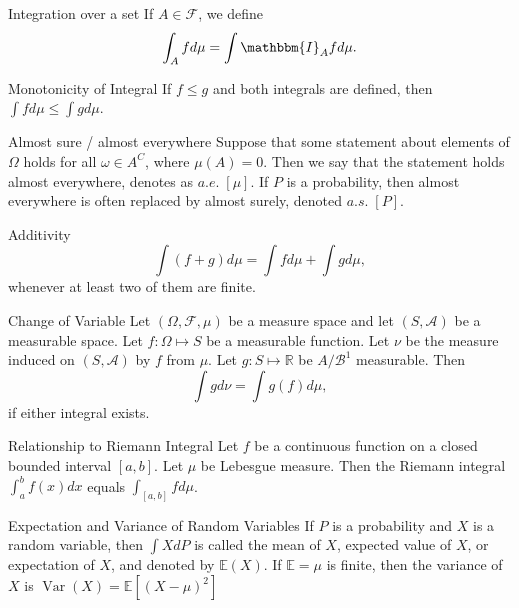 \documentclass[avery5371,grid]{flashcards}
\begin{document}
\begin{flashcard}[Definition]{Integration over a set}
 If $A \in \mathcal{F}$, we define 
 \[
 \int_A f d\mu = \int \mathbbm{I}_A f d\mu.
 \]
\end{flashcard}

\begin{flashcard}[Proposition]{Monotonicity of Integral}
 If $f \le g$ and both integrals are defined, then $\int f d\mu \le \int g d\mu$.
\end{flashcard}

\begin{flashcard}[Definition]{Almost sure / almost everywhere}
 Suppose that some statement about elements of $\Omega$ holds for all $\omega \in A^C$,
 where $\mu\left( A \right) = 0$. Then we say that the statement holds almost everywhere,
 denotes as $a.e. \; [\mu]$. If $P$ is a probability, then almost everywhere is often replaced
 by almost surely, denoted $a.s. \; [P]$.
\end{flashcard}

\begin{flashcard}[Theorem]{Additivity}
 \[
 \int \left( f +g \right) d\mu = \int f d\mu + \int g d\mu,
 \]
 whenever at least two of them are finite. 
\end{flashcard}

\begin{flashcard}[Theorem]{Change of Variable}
Let $\left( \Omega, \mathcal{F}, \mu \right)$ be a measure space and let $\left( S, \mathcal{A} \right)$
be a measurable space. Let $f : \Omega \mapsto S$ be a measurable function. Let
$\nu$ be the measure induced on $\left( S,\mathcal{A} \right)$ by $f$ from
$\mu$. Let $g : S \mapsto \mathbb{R}$ be $A/\mathcal{B}^1$ measurable. Then
\[
\int g d\nu = \int g(f) d\mu,
\]
if either integral exists.
\end{flashcard}

\begin{flashcard}[Theorem]{Relationship to Riemann Integral}
Let $f$ be a continuous function on a closed bounded interval $\left[ a,b \right]$.
Let $\mu$ be Lebesgue measure. Then the Riemann integral $\int_a^b f(x) dx$ equals
$\int_{\left[ a,b \right]} f d\mu$.
\end{flashcard}

\begin{flashcard}[Definition]{Expectation and Variance of Random Variables}
 If $P$ is a probability and $X$ is a random variable, then
 $\int X dP$ is called the mean of $X$, expected value of $X$,  or expectation of
 $X$, and denoted by $\mathbb{E}\left( X \right)$. If $\mathbb{E} = \mu$ is finite, 
 then the variance of $X$ is $\operatorname{Var}\left( X \right) = \mathbb{E} \left[ \left( X - \mu \right)^2 \right]$
\end{flashcard}
\end{document}
